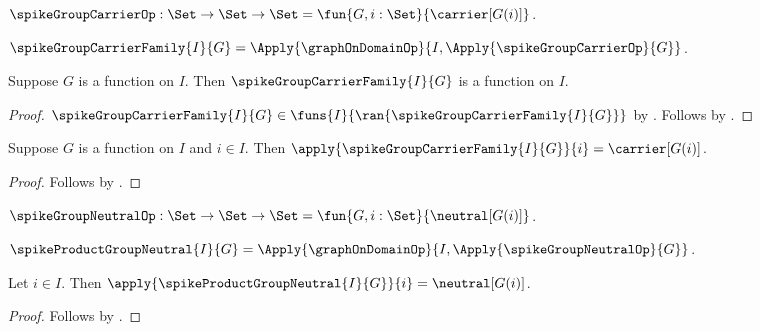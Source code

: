 \begin{definition}\label{spike_group_carrier_op}
    $\spikeGroupCarrierOp:\Set\to\Set\to\Set
        =\fun{G,i:\Set}{\carrier[G(i)]}$.
\end{definition}

\begin{definition}\label{spike_group_carrier_family}
    $\spikeGroupCarrierFamily{I}{G}
        =\Apply{\graphOnDomainOp}{
            I,\Apply{\spikeGroupCarrierOp}{G}}$.
\end{definition}

\begin{proposition}\label{spike_group_carrier_family_type}
    Suppose $G$ is a function on $I$.
    Then $\spikeGroupCarrierFamily{I}{G}$ is a function on $I$.
\end{proposition}
\begin{proof}
    $\spikeGroupCarrierFamily{I}{G}\in
        \funs{I}{\ran{\spikeGroupCarrierFamily{I}{G}}}$ by
        .
    Follows by .
\end{proof}

\begin{proposition}\label{spike_group_carrier_family_apply}
    Suppose $G$ is a function on $I$ and $i\in I$.
    Then
        $\apply{\spikeGroupCarrierFamily{I}{G}}{i}
            =\carrier[G(i)]$.
\end{proposition}
\begin{proof}
    Follows by
        .
\end{proof}

\begin{definition}\label{spike_group_neutral_op}
    $\spikeGroupNeutralOp:\Set\to\Set\to\Set
        =\fun{G,i:\Set}{\neutral[G(i)]}$.
\end{definition}

\begin{definition}\label{spike_product_group_neutral}
    $\spikeProductGroupNeutral{I}{G}
        =\Apply{\graphOnDomainOp}{
            I,\Apply{\spikeGroupNeutralOp}{G}}$.
\end{definition}

\begin{proposition}\label{spike_product_group_neutral_coordinate}
    Let $i\in I$.
    Then
        $\apply{\spikeProductGroupNeutral{I}{G}}{i}
            =\neutral[G(i)]$.
\end{proposition}
\begin{proof}
    Follows by
        .
\end{proof}

